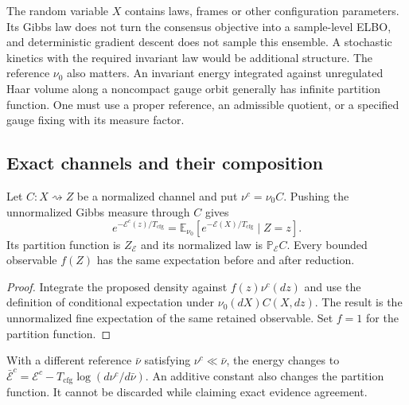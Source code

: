 \begin{remark}\label{rem:gibbs_lift_interpretation}
The random variable $X$ contains laws, frames or other configuration parameters. Its Gibbs law does not turn the consensus objective into a sample-level ELBO, and deterministic gradient descent does not sample this ensemble. A stochastic kinetics with the required invariant law would be additional structure. The reference $\nu_0$ also matters. An invariant energy integrated against unregulated Haar volume along a noncompact gauge orbit generally has infinite partition function. One must use a proper reference, an admissible quotient, or a specified gauge fixing with its measure factor.
\end{remark}

\subsection{Exact channels and their composition}
\begin{proposition}\label{thm:rg_pushforward}
Let $C:X\rightsquigarrow Z$ be a normalized channel and put $\nu^c=\nu_0C$. Pushing the unnormalized Gibbs measure through $C$ gives
\begin{equation}
e^{-\mathcal E^c(z)/T_{\mathrm{cfg}}}
=\mathbb E_{\nu_0}[e^{-\mathcal E(X)/T_{\mathrm{cfg}}}\mid Z=z].
\label{eq:rg_exact_free_energy}
\end{equation}
Its partition function is $Z_{\mathcal E}$ and its normalized law is $\mathbb P_{\mathcal E}C$. Every bounded observable $f(Z)$ has the same expectation before and after reduction.
\end{proposition}
\begin{proof}
Integrate the proposed density against $f(z)\nu^c(dz)$ and use the definition of conditional expectation under $\nu_0(dX)C(X,dz)$. The result is the unnormalized fine expectation of the same retained observable. Set $f=1$ for the partition function.
\end{proof}
With a different reference $\bar\nu$ satisfying $\nu^c\ll\bar\nu$, the energy changes to
$\bar{\mathcal E}^c=\mathcal E^c-T_{\mathrm{cfg}}\log(d\nu^c/d\bar\nu)$.
An additive constant also changes the partition function. It cannot be discarded while claiming exact evidence agreement.

